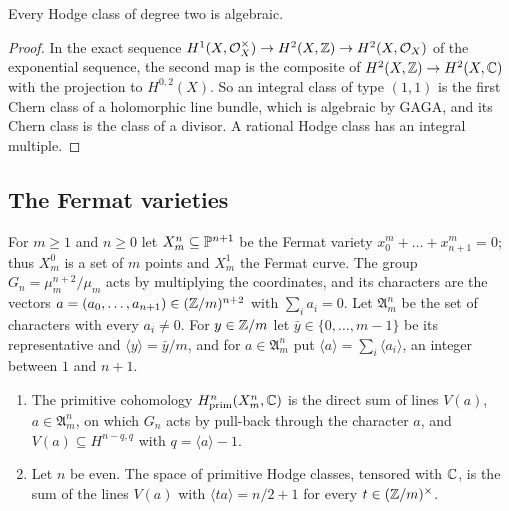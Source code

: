 \begin{theorem}\label{thm:lef11}
Every Hodge class of degree two is algebraic.
\end{theorem}

\begin{proof}
In the exact sequence $H^{1}(X,\mathcal{O}_{X}^{\times})\to H^{2}(X,\mathbb{Z})\to
H^{2}(X,\mathcal{O}_{X})$ of the exponential sequence, the second map is the
composite of $H^{2}(X,\mathbb{Z})\to H^{2}(X,\mathbb{C})$ with the projection to
$H^{0,2}(X)$. So an integral class of type $(1,1)$ is the first Chern class
of a holomorphic line bundle, which is algebraic by GAGA, and its Chern class
is the class of a divisor. A rational Hodge class has an integral multiple.
\end{proof}

\subsection{The Fermat varieties}
For $m\ge1$ and $n\ge0$ let $X^{n}_{m}\subseteq\mathbb{P}^{n+1}$ be the Fermat
variety $x_{0}^{m}+\dots+x_{n+1}^{m}=0$; thus $X^{0}_{m}$ is a set of $m$
points and $X^{1}_{m}$ the Fermat curve. The group
$G_{n}=\mu_{m}^{n+2}/\mu_{m}$ acts by multiplying the coordinates, and its
characters are the vectors $a=(a_{0},\dots,a_{n+1})\in(\mathbb{Z}/m)^{n+2}$ with
$\sum_{i}a_{i}=0$. Let $\mathfrak A^{n}_{m}$ be the set of characters with
every $a_{i}\ne0$. For $y\in\mathbb{Z}/m$ let $\bar y\in\{0,\dots,m-1\}$ be its
representative and $\langle y\rangle=\bar y/m$, and for
$a\in\mathfrak A^{n}_{m}$ put $\langle a\rangle=\sum_{i}\langle a_{i}\rangle$,
an integer between $1$ and $n+1$.

\begin{proposition}\label{prop:fermatchars}
\begin{enumerate}[label=\textup{(\roman*)}]
\item The primitive cohomology $H^{n}_{\mathrm{prim}}(X^{n}_{m},\mathbb{C})$ is the
direct sum of lines $V(a)$, $a\in\mathfrak A^{n}_{m}$, on which $G_{n}$ acts
by pull-back through the character $a$, and $V(a)\subseteq H^{n-q,q}$ with
$q=\langle a\rangle-1$.
\item Let $n$ be even. The space of primitive Hodge classes, tensored with
$\mathbb{C}$, is the sum of the lines $V(a)$ with $\langle ta\rangle=n/2+1$ for
every $t\in(\mathbb{Z}/m)^{\times}$.
\end{enumerate}
\end{proposition}

